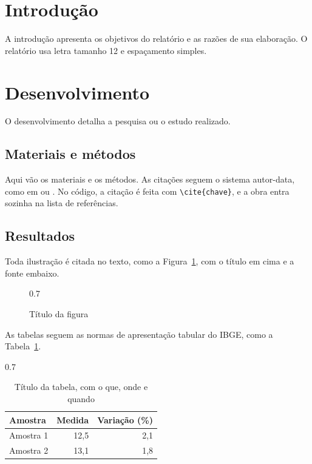\documentclass[12pt,a4paper,oneside]{article}
\begin{document}
\section{Introdução}

A introdução apresenta os objetivos do relatório e as razões de sua elaboração. O relatório usa letra tamanho 12 e espaçamento simples.

\section{Desenvolvimento}

O desenvolvimento detalha a pesquisa ou o estudo realizado.

\subsection{Materiais e métodos}

Aqui vão os materiais e os métodos. As citações seguem o sistema autor-data, como em \cite[p.~15]{livro2024} ou . No código, a citação é feita com \texttt{\textbackslash cite\{chave\}}, e a obra entra sozinha na lista de referências.

\subsection{Resultados}

Toda ilustração é citada no texto, como a Figura~\ref{fig:exemplo}, com o título em cima e a fonte embaixo.

\begin{figure}[htbp]
  \begin{ilustracao}{0.7\textwidth}
    \caption{Título da figura}\label{fig:exemplo}
  \end{ilustracao}
\end{figure}

As tabelas seguem as normas de apresentação tabular do IBGE, como a Tabela~\ref{tab:exemplo}.

\begin{table}[htbp]
  \begin{ilustracao}{0.7\textwidth}
    \caption{Título da tabela, com o que, onde e quando}\label{tab:exemplo}
    \centering
    \begin{tabular*}{\linewidth}{@{\extracolsep{\fill}}lrr}
      \toprule
      Amostra & Medida & Variação (\%) \\
      \midrule
      Amostra 1 & 12,5 & 2,1 \\
      Amostra 2 & 13,1 & 1,8 \\
      \bottomrule
    \end{tabular*}
  \end{ilustracao}
\end{table}
\end{document}
